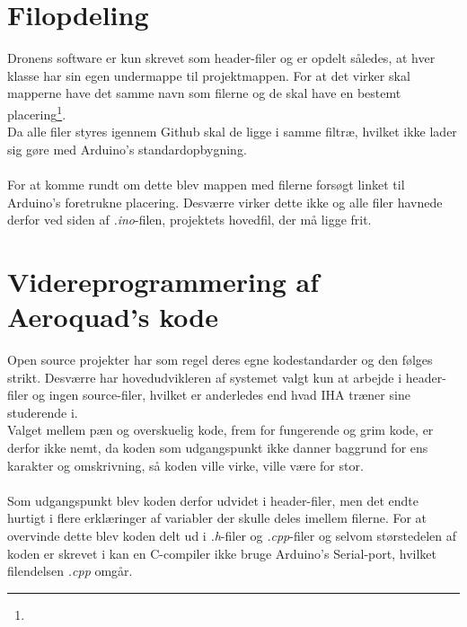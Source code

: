 \documentclass[Main]{subfiles}
\begin{document}
\section{Filopdeling}
Dronens software er kun skrevet som header-filer og er opdelt således, at hver klasse har sin egen undermappe til projektmappen.
For at det virker skal mapperne have det samme navn som filerne og de skal have en bestemt placering\footnote{}.
\\
Da alle filer styres igennem Github skal de ligge i samme filtræ, hvilket ikke lader sig gøre med Arduino's standardopbygning.
\\
\\
For at komme rundt om dette blev mappen med filerne forsøgt linket til Arduino's foretrukne  placering.
Desværre virker dette ikke og alle filer havnede derfor ved siden af \textit{.ino}-filen, projektets hovedfil, der må ligge frit.


\section{Videreprogrammering af Aeroquad's kode}
Open source projekter har som regel deres egne kodestandarder og den følges strikt.
Desværre har hovedudvikleren af systemet valgt kun at arbejde i header-filer og ingen source-filer, hvilket er anderledes end hvad IHA træner sine studerende i.
\\
Valget mellem pæn og overskuelig kode, frem for fungerende og grim kode, er derfor ikke nemt, da koden som udgangspunkt ikke danner baggrund for ens karakter og omskrivning, så koden ville virke, ville være for stor.
\\
\\
Som udgangspunkt blev koden derfor udvidet i header-filer, men det endte hurtigt i flere erklæringer af variabler der skulle deles imellem filerne. 
For at overvinde dette blev koden delt ud i \textit{.h}-filer og \textit{.cpp}-filer og selvom størstedelen af koden er skrevet i  kan en C-compiler ikke bruge Arduino's Serial-port, hvilket filendelsen \textit{.cpp} omgår.
\end{document}
